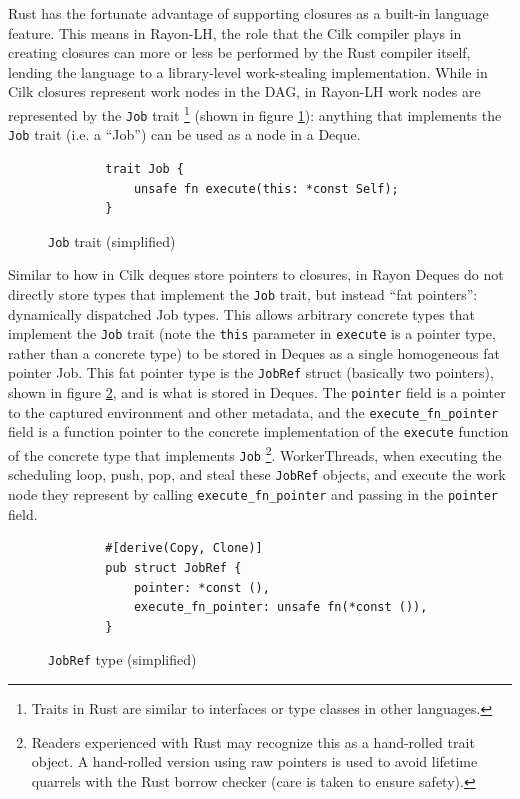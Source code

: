 \documentclass[bsc,frontabs,singlespacing,parskip,deptreport,normalheadings]{infthesis}
\begin{document}
Rust has the fortunate advantage of supporting closures as a built-in language
feature. This means in Rayon-LH, the role that the Cilk compiler plays in
creating closures can more or less be performed by the Rust compiler itself,
lending the language to a library-level work-stealing implementation. While in
Cilk closures represent work nodes in the DAG, in Rayon-LH work nodes are
represented by the \texttt{Job} trait \footnote{Traits in Rust are similar to
interfaces or type classes in other languages.} (shown in figure
\ref{fig:job_trait}): anything that implements the \texttt{Job} trait (i.e. a
``Job'') can be used as a node in a Deque.

\begin{figure}[ht]
    \begin{verbatim}
        trait Job {
            unsafe fn execute(this: *const Self);
        }
    \end{verbatim}
    \caption{\texttt{Job} trait (simplified)}
    \label{fig:job_trait}
\end{figure}

Similar to how in Cilk deques store pointers to closures, in Rayon Deques do not
directly store types that implement the \texttt{Job} trait, but instead ``fat
pointers'': dynamically dispatched Job types. This allows arbitrary concrete
types that implement the \texttt{Job} trait (note the \texttt{this} parameter in
\texttt{execute} is a pointer type, rather than a concrete type) to be stored in
Deques as a single homogeneous fat pointer Job. This fat pointer type is the
\texttt{JobRef} struct (basically two pointers), shown in figure
\ref{fig:job_ref}, and is what is stored in Deques. The \texttt{pointer} field
is a pointer to the captured environment and other metadata, and the
\texttt{execute\_fn\_pointer} field is a function pointer to the concrete
implementation of the \texttt{execute} function of the concrete type that
implements \texttt{Job} \footnote{Readers experienced with Rust may recognize
    this as a hand-rolled trait object. A hand-rolled version using raw pointers
is used to avoid lifetime quarrels with the Rust borrow checker (care is taken
to ensure safety).}. WorkerThreads, when executing the scheduling loop, push,
pop, and steal these \texttt{JobRef} objects, and execute the work node they
represent by calling \texttt{execute\_fn\_pointer} and passing in the
\texttt{pointer} field.

\begin{figure}[ht]
    \begin{verbatim}
        #[derive(Copy, Clone)]
        pub struct JobRef {
            pointer: *const (),
            execute_fn_pointer: unsafe fn(*const ()),
        }
    \end{verbatim}
    \caption{\texttt{JobRef} type (simplified)}
    \label{fig:job_ref}
\end{figure}
\end{document}
